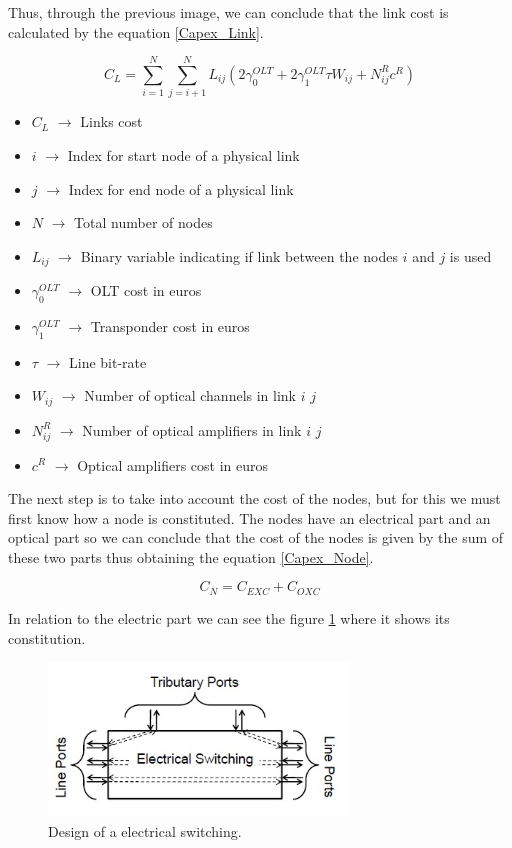 \newpage
Thus, through the previous image, we can conclude that the link cost is calculated by the equation \ref{Capex_Link}.

\begin{equation}
C_L = \sum_{i=1}^N \sum_{j=i+1}^N L_{ij} \left( 2 \gamma_0^{OLT} + 2 \gamma_1^{OLT} \tau W_{ij} + N^R_{ij} c^R \right)
\label{Capex_Link}
\end{equation}

\begin{itemize}
\item{$C_L$				$\rightarrow$	Links cost}
\item{$i$               $\rightarrow$   Index for start node of a physical link}
\item{$j$               $\rightarrow$   Index for end node of a physical link}
\item{$N$				$\rightarrow$	Total number of nodes}
\item{$L_{ij}$			$\rightarrow$	Binary variable indicating if link between the nodes $i$ and $j$ is used}
\item{$\gamma_0^{OLT}$	$\rightarrow$	OLT cost in euros}
\item{$\gamma_1^{OLT}$	$\rightarrow$	Transponder cost in euros}
\item{$\tau$		    $\rightarrow$	Line bit-rate}
\item{$W_{ij}$          $\rightarrow$   Number of optical channels in link $i$ $j$}
\item{$N^R_{ij}$    	$\rightarrow$	Number of optical amplifiers in link $i$ $j$}
\item{$c^R$				$\rightarrow$	Optical amplifiers cost in euros}
\end{itemize}


The next step is to take into account the cost of the nodes, but for this we must first know how a node is constituted. The nodes have an electrical part and an optical part so we can conclude that the cost of the nodes is given by the sum of these two parts thus obtaining the equation \ref{Capex_Node}.

\begin{equation}
C_N = C_{EXC} + C_{OXC}
\label{Capex_Node}
\end{equation}

\vspace{11pt}
In relation to the electric part we can see the figure \ref{exc_design} where it shows its constitution.

\begin{figure}[h!]
\centering
\includegraphics[width=8cm]{sdf/ILP/figures/exc_design}
\caption{Design of a electrical switching.}
\label{exc_design}
\end{figure}


